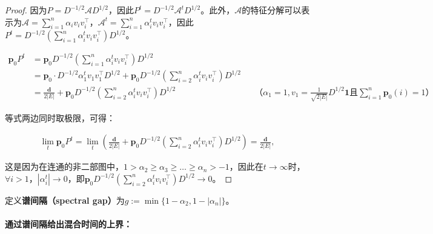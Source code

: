 \begin{proof}
                    
    因为$P=D^{-1/2}\mathcal{A}D^{1/2}$，因此$P^t=D^{-1/2}\mathcal{A}^tD^{1/2}$。此外，$\mathcal{A}$的特征分解可以表示为$\mathcal{A}=\sum_{i=1}^n{\alpha_iv_iv_i^{\top}}$，$\mathcal{A}^t=\sum_{i=1}^n{\alpha_i^tv_iv_i^{\top}}$，因此$P^t=D^{-1/2}\left(\sum_{i=1}^n{\alpha_i^tv_iv_i^{\top}}\right)D^{1/2}$。
                    
    \begin{align*}
        \bm{p}_0P^t&=\bm{p}_0D^{-1/2}\left(\sum_{i=1}^n{\alpha_i^tv_iv_i^{\top}}\right)D^{1/2}\\
        &=\bm{p}_0\cdot D^{-1/2}\alpha_1^tv_1v_1^{\top}D^{1/2}+\bm{p}_0D^{-1/2}\left(\sum_{i=2}^n{\alpha_i^tv_iv_i^{\top}}\right)D^{1/2}\\
        &=\frac{\bm{d}}{2|E|}+\bm{p}_0D^{-1/2}\left(\sum_{i=2}^n{\alpha_i^tv_iv_i^{\top}}\right)D^{1/2}&&\text{（$\alpha_1=1,v_1=\frac{1}{\sqrt{2|E|}}D^{1/2}\bm{1}$且$\sum_{i=1}^n\bm{p}_0(i)=1$）}
    \end{align*}

    等式两边同时取极限，可得：
                    
    \begin{align*}
        \lim_t \bm{p}_0P^t =\lim_t \left(\frac{\bm{d}}{2|E|}+\bm{p}_0D^{-1/2}\left(\sum_{i=2}^n{\alpha_i^tv_iv_i^{\top}}\right)D^{1/2}\right)=\frac{\bm{d}}{2|E|},
    \end{align*}

    这是因为在连通的非二部图中，$1>\alpha_2\ge \alpha_3\ge \dots\ge \alpha_n>-1$，因此在$t\to \infty$时，$\forall i>1$，${|\alpha_i^t|}\to 0$，即$\bm{p}_0D^{-1/2}\left(\sum_{i=2}^n{\alpha_i^tv_iv_i^{\top}}\right)D^{1/2}\to 0$。
\end{proof}

定义\textbf{谱间隔（spectral gap）}为$g:=\min\{1-\alpha_2,1-|\alpha_n|\}$。

\paragraph{通过谱间隔给出混合时间的上界：}

